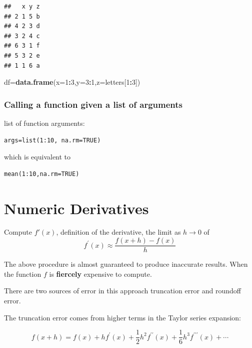 \documentclass[
]{book}
\newenvironment{Shaded}{\begin{snugshade}}{\end{snugshade}}
\newcommand{\DataTypeTok}[1]{\textcolor[rgb]{0.13,0.29,0.53}{#1}}
\newcommand{\DecValTok}[1]{\textcolor[rgb]{0.00,0.00,0.81}{#1}}
\newcommand{\KeywordTok}[1]{\textcolor[rgb]{0.13,0.29,0.53}{\textbf{#1}}}
\newcommand{\NormalTok}[1]{#1}
\newcommand{\OperatorTok}[1]{\textcolor[rgb]{0.81,0.36,0.00}{\textbf{#1}}}
\theoremstyle{definition}
\theoremstyle{definition}
\theoremstyle{definition}
\theoremstyle{remark}
\begin{document}
\begin{verbatim}
##   x y z
## 2 1 5 b
## 4 2 3 d
## 3 2 4 c
## 6 3 1 f
## 5 3 2 e
## 1 1 6 a
\end{verbatim}

\begin{Shaded}
\begin{Highlighting}[]
\NormalTok{df=}\KeywordTok{data.frame}\NormalTok{(}\DataTypeTok{x=}\DecValTok{1}\OperatorTok{:}\DecValTok{3}\NormalTok{,}\DataTypeTok{y=}\DecValTok{3}\OperatorTok{:}\DecValTok{1}\NormalTok{,}\DataTypeTok{z=}\NormalTok{letters[}\DecValTok{1}\OperatorTok{:}\DecValTok{3}\NormalTok{])}
\end{Highlighting}
\end{Shaded}

\hypertarget{calling-a-function-given-a-list-of-arguments}{%
\subsection{Calling a function given a list of arguments}\label{calling-a-function-given-a-list-of-arguments}}

list of function arguments:

\begin{verbatim}
args=list(1:10, na.rm=TRUE)
\end{verbatim}

which is equivalent to

\begin{verbatim}
mean(1:10,na.rm=TRUE)
\end{verbatim}

\hypertarget{numeric-derivatives}{%
\chapter{Numeric Derivatives}\label{numeric-derivatives}}

Compute \(f'(x)\), definition of the derivative, the limit as \(h\rightarrow 0\) of
\[
f^{\prime}(x) \approx \frac{f(x+h)-f(x)}{h}
\]

The above procedure is almost guaranteed to produce inaccurate results. When the function \(f\) is \textbf{fiercely} expensive to compute.

There are two sources of error in this approach truncation error and roundoff error.

The truncation error comes from higher terms in the Taylor series expansion:

\[
f(x+h)=f(x)+h f^{\prime}(x)+\frac{1}{2} h^{2} f^{\prime \prime}(x)+\frac{1}{6} h^{3} f^{\prime \prime \prime}(x)+\cdots
\]
\end{document}
